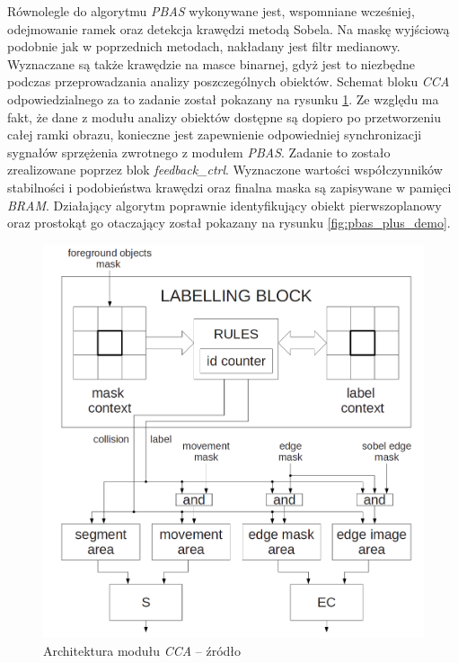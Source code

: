 Równolegle do algorytmu \textit{PBAS} wykonywane jest, wspomniane wcześniej, odejmowanie ramek oraz detekcja krawędzi metodą Sobela. 
Na maskę wyjściową podobnie jak w poprzednich metodach, nakładany jest filtr medianowy. 
Wyznaczane są także krawędzie na masce binarnej, gdyż jest to niezbędne podczas przeprowadzania analizy poszczególnych obiektów. 
Schemat bloku \textit{CCA} odpowiedzialnego za to zadanie został pokazany na rysunku \ref{fig:cca_diagram}. 
Ze względu ma fakt, że dane z modułu analizy obiektów dostępne są dopiero po przetworzeniu całej ramki obrazu, konieczne jest zapewnienie odpowiedniej synchronizacji sygnałów sprzężenia zwrotnego z modułem  \textit{PBAS}. 
Zadanie to zostało zrealizowane poprzez blok \textit{feedback\_ctrl}. 
Wyznaczone wartości współczynników stabilności i podobieństwa krawędzi oraz finalna maska są zapisywane w pamięci \textit{BRAM}. 
Działający algorytm poprawnie identyfikujący obiekt pierwszoplanowy oraz prostokąt go otaczający został pokazany na rysunku \ref{fig:pbas_plus_demo}.

	\begin{figure}[h!]
		\centering
		\includegraphics[scale=0.35]{img/4/cca_diagram.png}
		\caption{Architektura modułu \textit{CCA} -- źródło \cite{kryjak_14_pbas}}
		\label{fig:cca_diagram}
	\end{figure}

